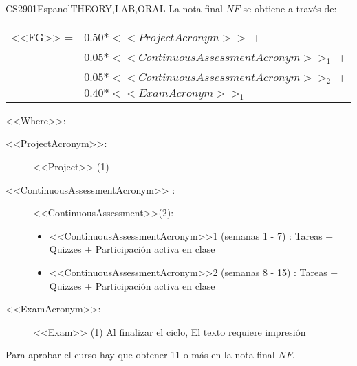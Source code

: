     \begin{evaluation}{CS2901}{Espanol}{THEORY,LAB,ORAL}
    La nota final $NF$ se obtiene a través de:
    
    \begin{tabular}{cl}
        <<FG>> = & $0.50*<<ProjectAcronym>>$ + \\
                 & $0.05*<<ContinuousAssessmentAcronym>>_{1}$ + \\
                 & $0.05*<<ContinuousAssessmentAcronym>>_{2}$ +  \\
                 & $0.40*<<ExamAcronym>>_{1}$
    \end{tabular}
    
    \noindent <<Where>>:
    \begin{description}
       \item[<<ProjectAcronym>>:] <<Project>> (1)
       \item[<<ContinuousAssessmentAcronym>> :] <<ContinuousAssessment>>(2):
        \begin{itemize}
              \item <<ContinuousAssessmentAcronym>>1 (semanas 1 - 7) : Tareas + Quizzes + Participación activa en clase 
               \item <<ContinuousAssessmentAcronym>>2 (semanas 8 - 15) : Tareas + Quizzes + Participación activa en clase 
         \end{itemize}
       \item[<<ExamAcronym>>:] <<Exam>> (1) Al finalizar el ciclo, El texto requiere impresión
    \end{description}
    
    \noindent Para aprobar el curso hay que obtener 11 o más en la nota final $NF$.
    \end{evaluation}
    
